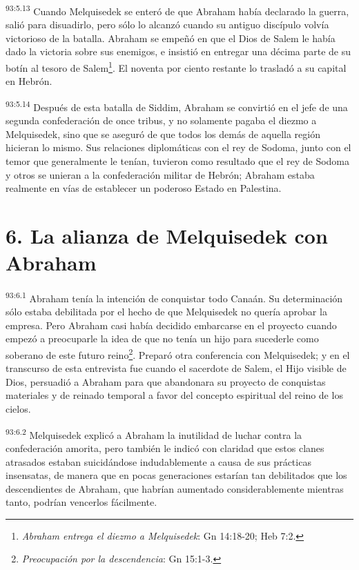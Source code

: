 \par
\textsuperscript{93:5.13} Cuando Melquisedek se enteró de que Abraham había declarado la guerra, salió para disuadirlo, pero sólo lo alcanzó cuando su antiguo discípulo volvía victorioso de la batalla. Abraham se empeñó en que el Dios de Salem le había dado la victoria sobre sus enemigos, e insistió en entregar una décima parte de su botín al tesoro de Salem\footnote{\textit{Abraham entrega el diezmo a Melquisedek}: Gn 14:18-20; Heb 7:2.}. El noventa por ciento restante lo trasladó a su capital en Hebrón.

\par
\textsuperscript{93:5.14} Después de esta batalla de Siddim, Abraham se convirtió en el jefe de una segunda confederación de once tribus, y no solamente pagaba el diezmo a Melquisedek, sino que se aseguró de que todos los demás de aquella región hicieran lo mismo. Sus relaciones diplomáticas con el rey de Sodoma, junto con el temor que generalmente le tenían, tuvieron como resultado que el rey de Sodoma y otros se unieran a la confederación militar de Hebrón; Abraham estaba realmente en vías de establecer un poderoso Estado en Palestina.

\section*{6. La alianza de Melquisedek con Abraham}
\par
\textsuperscript{93:6.1} Abraham tenía la intención de conquistar todo Canaán. Su determinación sólo estaba debilitada por el hecho de que Melquisedek no quería aprobar la empresa. Pero Abraham casi había decidido embarcarse en el proyecto cuando empezó a preocuparle la idea de que no tenía un hijo para sucederle como soberano de este futuro reino\footnote{\textit{Preocupación por la descendencia}: Gn 15:1-3.}. Preparó otra conferencia con Melquisedek; y en el transcurso de esta entrevista fue cuando el sacerdote de Salem, el Hijo visible de Dios, persuadió a Abraham para que abandonara su proyecto de conquistas materiales y de reinado temporal a favor del concepto espiritual del reino de los cielos.

\par
\textsuperscript{93:6.2} Melquisedek explicó a Abraham la inutilidad de luchar contra la confederación amorita, pero también le indicó con claridad que estos clanes atrasados estaban suicidándose indudablemente a causa de sus prácticas insensatas, de manera que en pocas generaciones estarían tan debilitados que los descendientes de Abraham, que habrían aumentado considerablemente mientras tanto, podrían vencerlos fácilmente.


